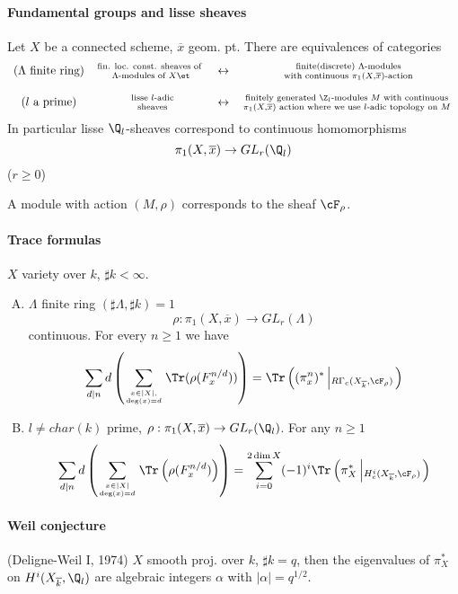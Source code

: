 \paragraph{Fundamental groups and lisse sheaves}
	Let $X$ be a connected scheme, $\overline x$ geom. pt. There are equivalences of categories 
		$$\begin{array}{ccccccc}
		\text{($\Lambda$ finite ring)}& \text{fin. loc. const. sheaves of }
		\atop \Lambda\text{-modules of }X\et & \leftrightarrow & \text{ finite(discrete) }\Lambda\text{-modules}\atop\text{ with continuous }\pi_1(X, \overline x)\text{-action}\\
		\\
		(l\text{ a prime}) & \text{ lisse }l\text{-adic}\atop\text{ sheaves} & \leftrightarrow & \text{ finitely generated }\Z_l\text{-modules } M \text{ with continuous }\atop \pi_1(X, \overline x)\text{ action where we use $l$-adic topology on } M
		\end{array}$$
In particular lisse $\Q_l$-sheaves correspond to continuous homomorphisms 
	$$\pi_1(X, \overline x) \to GL_r(\Q_l)$$
	($r\geq 0$)
	
\begin{notation} A module with action $(M, \rho)$ corresponds to the sheaf $\cF_\rho$. \end{notation}

\paragraph{Trace formulas} $X$ variety over $k$, $\sharp k<\infty$. 
\begin{enumerate}[(A)]
	\item $\Lambda$ finite ring $(\sharp \Lambda, \sharp k)=1$
		$$\rho: \pi_1(X, \overline x)\to GL_r(\Lambda)$$
		continuous. For every $n\geq 1$ we have
		$$\sum_{d|n}d\left(\sum_{x\in |X|, \atop\deg(x)=d}\Tr(\rho(F_x^{n/d}))\right) = \Tr\left((\pi_x^n)^*\left|_{R\Gamma_c(X_{\overline k}, \cF_\rho)}\right.\right)$$
		
	\item $l\neq char(k)$ prime, $\rho: \pi_1(X, \overline x)\to GL_r(\Q_l)$. For any $n\geq 1$
		$$\sum_{d|n}d\left(\sum_{x\in |X|\atop \deg(x)=d}\Tr\left(\rho(F_x^{n/d})\right)\right)=\sum_{i=0}^{2\dim X}(-1)^i \Tr\left(\pi_X^*\left|_{H_c^i(X_{\overline k}, \cF_\rho)}\right.\right)$$
\end{enumerate}

\paragraph{Weil conjecture}  (Deligne-Weil I, 1974) $X$ smooth proj. over $k$, $\sharp k=q$, then the eigenvalues of $\pi_X^*$ on $H^i(X_{\overline k}, \Q_l)$ are algebraic integers $\alpha$ with $|\alpha|=q^{1/2}$. 

